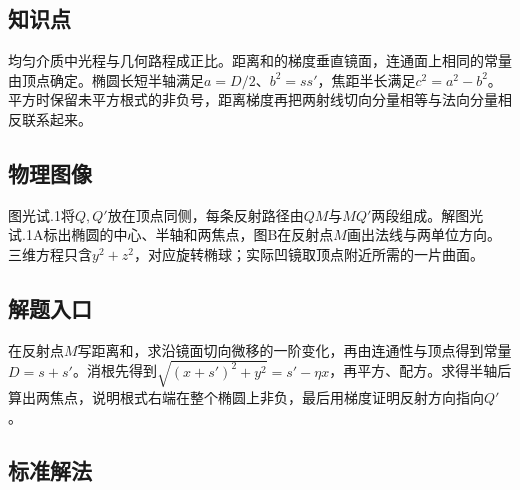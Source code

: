 \documentclass[UTF8,fontset=fandol,a4paper,11pt]{ctexart}
\begin{document}


\subsection*{知识点}

均匀介质中光程与几何路程成正比。距离和的梯度垂直镜面，连通面上相同的常量由顶点确定。椭圆长短半轴满足$a=D/2$、$b^2=ss'$，焦距半长满足$c^2=a^2-b^2$。平方时保留未平方根式的非负号，距离梯度再把两射线切向分量相等与法向分量相反联系起来。



\subsection*{物理图像}

图光试.1将$Q,Q'$放在顶点同侧，每条反射路径由$QM$与$MQ'$两段组成。解图光试.1A标出椭圆的中心、半轴和两焦点，图B在反射点$M$画出法线与两单位方向。三维方程只含$y^2+z^2$，对应旋转椭球；实际凹镜取顶点附近所需的一片曲面。



\subsection*{解题入口}

在反射点$M$写距离和，求沿镜面切向微移的一阶变化，再由连通性与顶点得到常量$D=s+s'$。消根先得到$\sqrt{(x+s')^2+y^2}=s'-\eta x$，再平方、配方。求得半轴后算出两焦点，说明根式右端在整个椭圆上非负，最后用梯度证明反射方向指向$Q'$。



\subsection*{标准解法}
\end{document}
